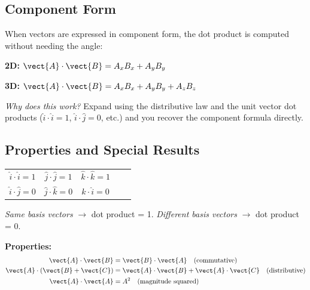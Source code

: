 \subsection*{Component Form}

When vectors are expressed in component form, the dot
product is computed without needing the angle:

\begin{lawbox}
\textbf{2D:}
$\vect{A}\cdot\vect{B}
= A_x B_x + A_y B_y$

\vspace{0.2cm}

\textbf{3D:}
$\vect{A}\cdot\vect{B}
= A_x B_x + A_y B_y + A_z B_z$
\end{lawbox}

\textit{Why does this work?} Expand using the
distributive law and the unit vector dot products
($\hat{i}\cdot\hat{i} = 1$,
$\hat{i}\cdot\hat{j} = 0$, etc.) and you recover
the component formula directly.

\subsection*{Properties and Special Results}

\begin{keybox}
\centering
\begin{tabular}{ccccc}
$\hat{i}\cdot\hat{i}=1$ &
$\hat{j}\cdot\hat{j}=1$ &
$\hat{k}\cdot\hat{k}=1$ \\[4pt]
$\hat{i}\cdot\hat{j}=0$ &
$\hat{j}\cdot\hat{k}=0$ &
$\hat{k}\cdot\hat{i}=0$ \\
\end{tabular}

\vspace{0.2cm}
\textit{Same basis vectors} $\to$ dot product = 1.
\textit{Different basis vectors} $\to$ dot product = 0.
\end{keybox}

\textbf{Properties:}
\begin{align*}
  \vect{A}\cdot\vect{B}
  &= \vect{B}\cdot\vect{A}
  \quad \text{(commutative)}\\
  \vect{A}\cdot(\vect{B}+\vect{C})
  &= \vect{A}\cdot\vect{B}
  + \vect{A}\cdot\vect{C}
  \quad \text{(distributive)}\\
  \vect{A}\cdot\vect{A}
  &= A^2
  \quad \text{(magnitude squared)}
\end{align*}


